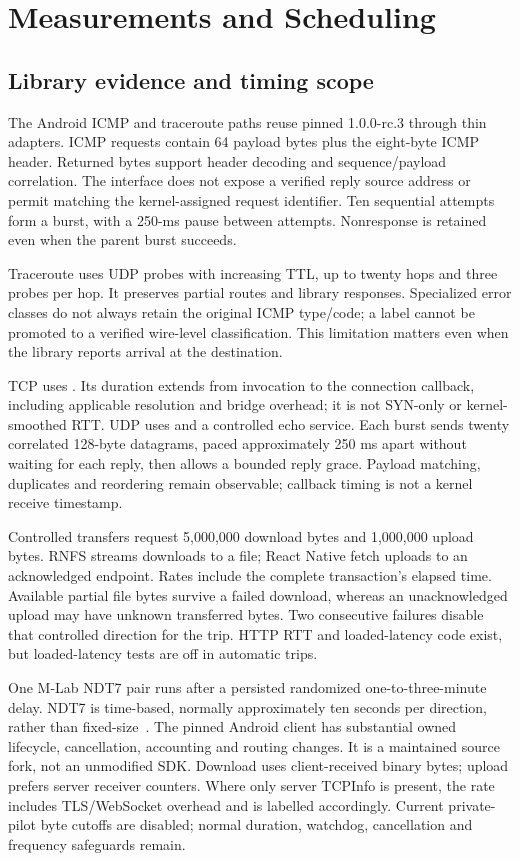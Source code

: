 \section{Measurements and Scheduling}
\subsection{Library evidence and timing scope}
The Android ICMP and traceroute paths reuse pinned 
1.0.0-rc.3 through thin adapters. ICMP requests contain 64 payload bytes plus
the eight-byte ICMP header. Returned bytes support header decoding and
sequence/payload correlation. The interface does not expose a verified reply
source address or permit matching the kernel-assigned request identifier.
Ten sequential attempts form a burst, with a 250-ms pause between attempts.
Nonresponse is retained even when the parent burst succeeds.

Traceroute uses UDP probes with increasing TTL, up to twenty hops and three
probes per hop. It preserves partial routes and library responses. Specialized
error classes do not always retain the original ICMP type/code; a
 label cannot be promoted to a verified wire-level
classification. This limitation matters even when the library reports arrival
at the destination.

TCP uses . Its duration extends from invocation to
the connection callback, including applicable resolution and bridge overhead;
it is not SYN-only or kernel-smoothed RTT. UDP uses  and
a controlled echo service. Each burst sends twenty correlated 128-byte
datagrams, paced approximately 250 ms apart without waiting for each reply,
then allows a bounded reply grace. Payload matching, duplicates and reordering
remain observable; callback timing is not a kernel receive timestamp.

Controlled transfers request 5,000,000 download bytes and 1,000,000 upload bytes.
RNFS streams downloads to a file; React Native fetch uploads to an acknowledged
endpoint. Rates include the complete transaction's elapsed time. Available
partial file bytes survive a failed download, whereas an unacknowledged upload
may have unknown transferred bytes. Two consecutive failures disable that
controlled direction for the trip. HTTP RTT and loaded-latency code exist, but
loaded-latency tests are off in automatic trips.

One M-Lab NDT7 pair runs after a persisted randomized one-to-three-minute delay.
NDT7 is time-based, normally approximately ten seconds per direction, rather
than fixed-size~\cite{ndt7}. The pinned Android client has substantial owned
lifecycle, cancellation, accounting and routing changes. It is a maintained
source fork, not an unmodified SDK. Download uses client-received binary bytes;
upload prefers server receiver counters. Where only server TCPInfo is present,
the rate includes TLS/WebSocket overhead and is labelled accordingly. Current
private-pilot byte cutoffs are disabled; normal duration, watchdog, cancellation
and frequency safeguards remain.

